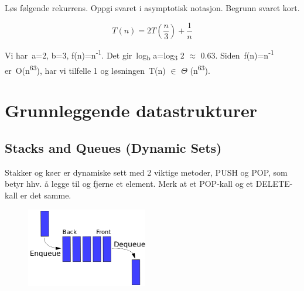 \documentclass[12pt]{report}
\begin{document}
Løs følgende rekurrens. Oppgi svaret i asymptotisk notasjon. Begrunn svaret kort.\par

\begin{Center}
 \[ T \left( n \right) =2T \left( \frac{n}{3} \right) +\frac{1}{n} \] 
\end{Center}\par


\vspace{\baselineskip}
\setlength{\parskip}{0.0pt}
Vi har a=2, b=3, f(n)=n\textsuperscript{-1}. Det gir log\textsubscript{b} a=log\textsubscript{3} 2 $ \approx $  0.63. Siden f(n)=n\textsuperscript{-1} er O(n\textsuperscript{63}), har vi tilfelle 1 og løsningen T(n) $ \in $  $ \Theta $ (n\textsuperscript{63}).


\newpage
\par

\section*{Grunnleggende datastrukturer}
\subsection*{Stacks and Queues (Dynamic Sets)}
\setlength{\parskip}{10.56pt}
Stakker og køer er dynamiske sett med 2 viktige metoder, PUSH og POP, som betyr hhv. å legge til og fjerne et element. Merk at et POP-kall og et DELETE-kall er det samme.\par




\begin{figure}[H]
	\begin{Center}
		\includegraphics[width=150pt,height=98.4pt]{./media/image6.png}
	\end{Center}
\end{figure}
\end{document}
